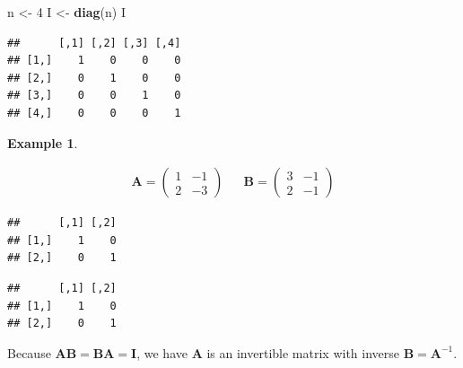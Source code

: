 \documentclass[
]{book}
\newenvironment{Shaded}{\begin{snugshade}}{\end{snugshade}}
\newcommand{\CommentTok}[1]{\textcolor[rgb]{0.56,0.35,0.01}{\textit{#1}}}
\newcommand{\DecValTok}[1]{\textcolor[rgb]{0.00,0.00,0.81}{#1}}
\newcommand{\KeywordTok}[1]{\textcolor[rgb]{0.13,0.29,0.53}{\textbf{#1}}}
\newcommand{\NormalTok}[1]{#1}
\newcommand{\OperatorTok}[1]{\textcolor[rgb]{0.81,0.36,0.00}{\textbf{#1}}}
\newcommand{\StringTok}[1]{\textcolor[rgb]{0.31,0.60,0.02}{#1}}
\theoremstyle{definition}
\theoremstyle{definition}
\newtheorem{example}{Example}[chapter]
\theoremstyle{definition}
\theoremstyle{remark}
\begin{document}
\begin{Shaded}
\begin{Highlighting}[]
\NormalTok{n <-}\StringTok{ }\DecValTok{4}
\NormalTok{I <-}\StringTok{ }\KeywordTok{diag}\NormalTok{(n)}
\NormalTok{I}
\end{Highlighting}
\end{Shaded}

\begin{verbatim}
##      [,1] [,2] [,3] [,4]
## [1,]    1    0    0    0
## [2,]    0    1    0    0
## [3,]    0    0    1    0
## [4,]    0    0    0    1
\end{verbatim}

\begin{example}
\protect\hypertarget{exm:unlabeled-div-75}{}\label{exm:unlabeled-div-75}

\[
\begin{aligned}
\mathbf{A} = \begin{pmatrix} 1 & -1 \\ 2 & -3 \end{pmatrix} && \mathbf{B} = \begin{pmatrix} 3 & -1 \\ 2 & -1 \end{pmatrix}
\end{aligned}
\]

\begin{Shaded}
\end{Shaded}

\begin{verbatim}
##      [,1] [,2]
## [1,]    1    0
## [2,]    0    1
\end{verbatim}

\begin{Shaded}
\end{Shaded}

\begin{verbatim}
##      [,1] [,2]
## [1,]    1    0
## [2,]    0    1
\end{verbatim}

Because \(\mathbf{A} \mathbf{B} = \mathbf{B} \mathbf{A} = \mathbf{I}\), we have \(\mathbf{A}\) is an invertible matrix with inverse \(\mathbf{B} = \mathbf{A}^{-1}\).

\end{example}
\end{document}
